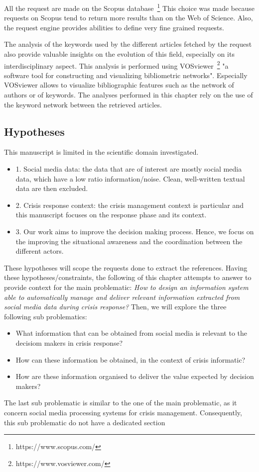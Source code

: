 All the request are made on the Scopus database~\footnote{https://www.scopus.com/}
This choice was made because requests on Scopus tend to return more results than on the Web of Science.
Also, the request engine provides abilities to define very fine grained requests.

The analysis of the keywords used by the different articles fetched by the request also provide valuable insights on the evolution of this field, especially on its interdisciplinary aspect.
This analysis is performed using VOSviewer~\footnote{https://www.vosviewer.com/} "a software tool for constructing and visualizing bibliometric networks".
Especially VOSviewer allows to visualize bibliographic features such as the network of authors or of keywords.
The analyses performed in this chapter rely on the use of the keyword network between the retrieved articles.

\subsection{Hypotheses}
This manuscript is limited in the scientific domain investigated.
\begin{itemize}
    \item 1. Social media data: the data that are of interest are mostly social media data, which have a low ratio information/noise. Clean, well-written textual data are then excluded.
    \item 2. Crisis response context: the crisis management context is particular and this manuscript focuses on the response phase and its context.
    \item 3. Our work aims to improve the decision making process. Hence, we focus on the improving the situational awareness and the coordination between the different actors.
\end{itemize}

These hypotheses will scope the requests done to extract the references.
Having these hypotheses/constraints, the following of this chapter attempts to answer to provide context for the main problematic:
\emph{How to design an information system able to automatically manage and deliver relevant information extracted from social media data during crisis response?}
Then, we will explore the three following sub problematics:
\begin{itemize}
    \item What information that can be obtained from social media is relevant to the decisiom makers in crisis response?
    \item How can these information be obtained, in the context of crisis informatic?
    \item How are these information organised to deliver the value expected by decision makers?
\end{itemize}
The last sub problematic is similar to the one of the main problematic, as it concern social media processing systems for crisis management.
Consequently, this sub problematic do not have a dedicated section

